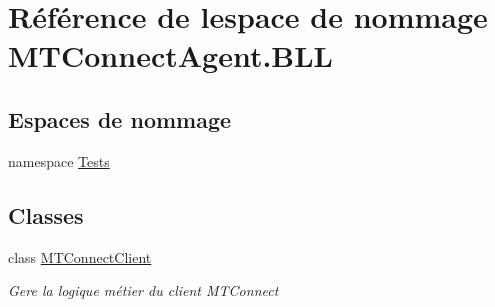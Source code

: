 \hypertarget{namespace_m_t_connect_agent_1_1_b_l_l}{}\section{Référence de l\textquotesingle{}espace de nommage M\+T\+Connect\+Agent.\+B\+LL}
\label{namespace_m_t_connect_agent_1_1_b_l_l}
\subsection*{Espaces de nommage}
\begin{DoxyCompactItemize}
\item 
namespace \mbox{\hyperlink{namespace_m_t_connect_agent_1_1_b_l_l_1_1_tests}{Tests}}
\end{DoxyCompactItemize}
\subsection*{Classes}
\begin{DoxyCompactItemize}
\item 
class \mbox{\hyperlink{class_m_t_connect_agent_1_1_b_l_l_1_1_m_t_connect_client}{M\+T\+Connect\+Client}}
\begin{DoxyCompactList}\small\item\em Gere la logique métier du client M\+T\+Connect \end{DoxyCompactList}\end{DoxyCompactItemize}
